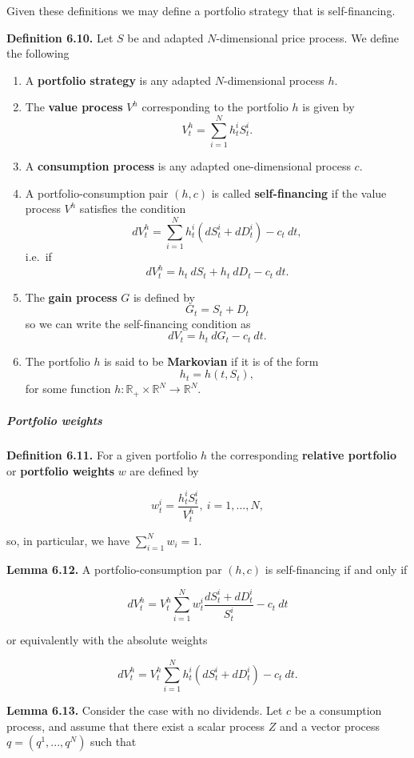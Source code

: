 \documentclass[
]{article}
\providecommand{\tightlist}{%
  \setlength{\itemsep}{0pt}\setlength{\parskip}{0pt}}
\begin{document}
Given these definitions we may define a portfolio strategy that is
self-financing.

\textbf{Definition 6.10.} Let \(S\) be and adapted \(N\)-dimensional
price process. We define the following

\begin{enumerate}
\def\labelenumi{\arabic{enumi}.}
\tightlist
\item
  A \textbf{portfolio strategy} is any adapted \(N\)-dimensional process
  \(h\).
\item
  The \textbf{value process} \(V^h\) corresponding to the portfolio
  \(h\) is given by \[
    V_t^h=\sum_{i=1}^N h_t^iS_t^i.
    \]
\item
  A \textbf{consumption process} is any adapted one-dimensional process
  \(c\).
\item
  A portfolio-consumption pair \((h,c)\) is called
  \textbf{self-financing} if the value process \(V^h\) satisfies the
  condition \[
    dV_t^h=\sum_{i=1}^N h_t^i(dS_t^i+d D^i_t)-c_t\ dt,
    \] i.e.~if \[
    dV_t^h=h_t\ dS_t + h_t\ dD_t -c_t\ dt.
    \]
\item
  The \textbf{gain process} \(G\) is defined by \[
    G_t=S_t+D_t
    \] so we can write the self-financing condition as \[
    dV_t=h_t\ dG_t-c_t\ dt.
    \]
\item
  The portfolio \(h\) is said to be \textbf{Markovian} if it is of the
  form \[
    h_t=h(t,S_t),
    \] for some function
  \(h : \mathbb{R}_+\times \mathbb{R}^N\to\mathbb{R}^N\).
\end{enumerate}

\hypertarget{portfolio-weights}{%
\subparagraph{Portfolio weights}\label{portfolio-weights}}

\textbf{Definition 6.11.} For a given portfolio \(h\) the corresponding
\textbf{relative portfolio} or \textbf{portfolio weights} \(w\) are
defined by

\[
w_t^i=\frac{h_t^iS_t^i}{V_t^h},\ i=1,...,N,
\]

so, in particular, we have \(\sum_{i=1}^N w_i=1\).

\textbf{Lemma 6.12.} A portfolio-consumption par \((h,c)\) is
self-financing if and only if

\[
dV_t^h=V_t^h\sum_{i=1}^N w_t^i\frac{dS_t^i+dD_t^i}{S_t^i}-c_t\ dt
\]

or equivalently with the absolute weights

\[
dV_t^h=V_t^h\sum_{i=1}^N h_t^i(dS_t^i+dD_t^i)-c_t\ dt.
\]

\textbf{Lemma 6.13.} Consider the case with no dividends. Let \(c\) be a
consumption process, and assume that there exist a scalar process \(Z\)
and a vector process \(q=(q^1,...,q^N)\) such that
\end{document}
